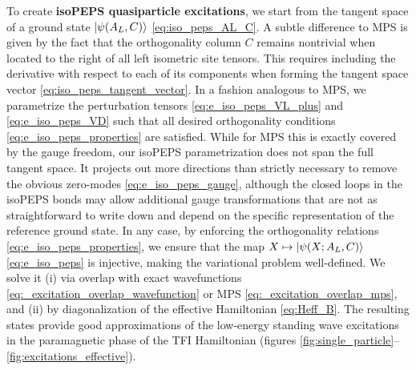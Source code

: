 \begin{enumerate}
To create \textbf{isoPEPS quasiparticle excitations}, we start from the tangent space of a ground state $\ket{\psi(A_L, C)}$ \eqref{eq:iso_peps_AL_C}. A subtle difference to MPS is given by the fact that the orthogonality column $C$ remains nontrivial when located to the right of all left isometric site tensors. This requires including the derivative with respect to each of its components when forming the tangent space vector \eqref{eq:iso_peps_tangent_vector}. In a fashion analogous to MPS, we parametrize the perturbation tensors \eqref{eq:e_iso_peps_VL_plus} and \eqref{eq:e_iso_peps_VD} such that all desired orthogonality conditions \eqref{eq:e_iso_peps_properties} are satisfied. While for MPS this is exactly covered by the gauge freedom, our isoPEPS parametrization does not span the full tangent space. It projects out more directions than strictly necessary to remove the obvious zero-modes \eqref{eq:e_iso_peps_gauge}, although the closed loops in the isoPEPS bonds may allow additional gauge transformations that are not as straightforward to write down and depend on the specific representation of the reference ground state. In any case, by enforcing the orthogonality relations \eqref{eq:e_iso_peps_properties}, we ensure that the map $X \mapsto \ket{\psi(X; A_L, C)}$ \eqref{eq:e_iso_peps} is injective, making the variational problem well-defined. We solve it (i) via overlap with exact wavefunctions \eqref{eq:_excitation_overlap_wavefunction} or MPS \eqref{eq:_excitation_overlap_mps}, and (ii) by diagonalization of the effective Hamiltonian \eqref{eq:Heff_B}. The resulting states provide good approximations of the low-energy standing wave excitations in the paramagnetic phase of the TFI Hamiltonian (figures \ref{fig:single_particle}--\ref{fig:excitations_effective}). \\[0.5em]
\end{enumerate}


